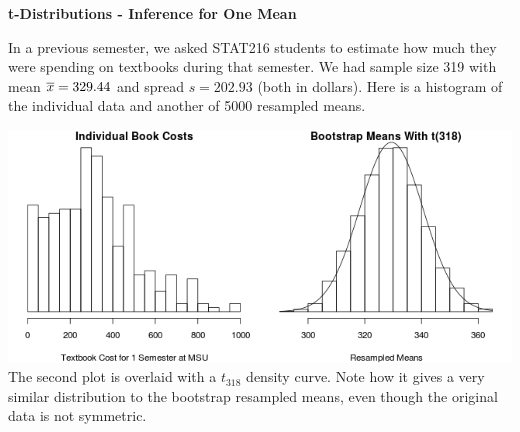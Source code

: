 \def\theTopic{t Procedures for a Single Mean }
\def\dayNum{24 }


\begin{center}
 {\large \textbf{t-Distributions - Inference for One Mean}}
\end{center}


In a previous semester, we asked STAT216 students to estimate how much they were
spending on textbooks during that semester.  We had sample size 319
with mean $\overline{x} = 329.44$ and spread $s = 202.93$ (both in
dollars). Here is a histogram of 
the individual data and another of 5000 resampled means.


\includegraphics[width=\linewidth]{plots/bookCostDistns.png}
The second plot is overlaid with a $t_{318}$ density curve.  Note how
it gives a very similar distribution to the bootstrap resampled means,
even though the original data is not symmetric.

